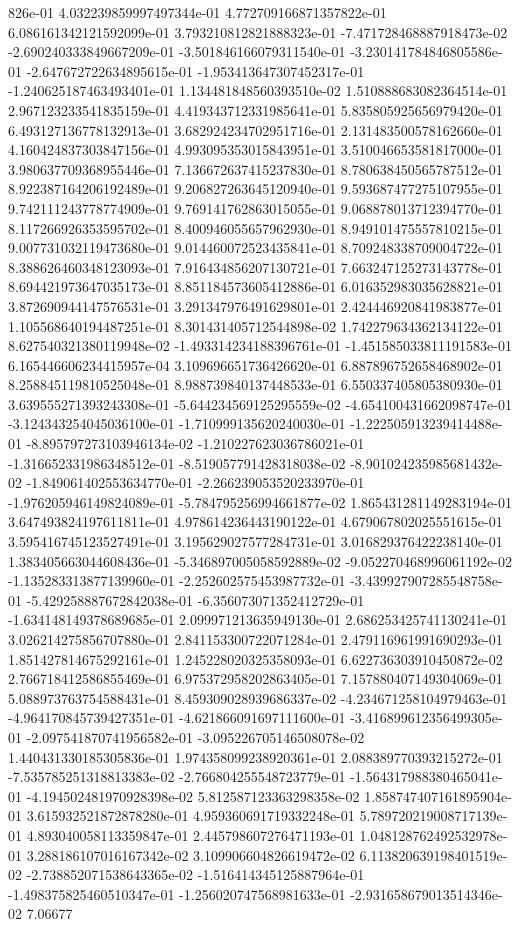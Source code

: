 826e-01	4.032239859997497344e-01	4.772709166871357822e-01	6.086161342121592099e-01	3.793210812821888323e-01	-7.471728468887918473e-02	-2.690240333849667209e-01	-3.501846166079311540e-01	-3.230141784846805586e-01	-2.647672722634895615e-01	-1.953413647307452317e-01	-1.240625187463493401e-01	1.134481848560393510e-02	1.510888683082364514e-01	2.967123233541835159e-01	4.419343712331985641e-01	5.835805925656979420e-01	6.493127136778132913e-01	3.682924234702951716e-01	2.131483500578162660e-01	4.160424837303847156e-01	4.993095353015843951e-01	3.510046653581817000e-01	3.980637709368955446e-01	7.136672637415237830e-01	8.780638450565787512e-01	8.922387164206192489e-01	9.206827263645120940e-01	9.593687477275107955e-01	9.742111243778774909e-01	9.769141762863015055e-01	9.068878013712394770e-01	8.117266926353595702e-01	8.400946055657962930e-01	8.949101475557810215e-01	9.007731032119473680e-01	9.014460072523435841e-01	8.709248338709004722e-01	8.388626460348123093e-01	7.916434856207130721e-01	7.663247125273143778e-01	8.694421973647035173e-01	8.851184573605412886e-01	6.016352983035628821e-01	3.872690944147576531e-01	3.291347976491629801e-01	2.424446920841983877e-01	1.105568640194487251e-01	8.301431405712544898e-02	1.742279634362134122e-01	8.627540321380119948e-02	-1.493314234188396761e-01	-1.451585033811191583e-01	6.165446606234415957e-04	3.109696651736426620e-01	6.887896752658468902e-01	8.258845119810525048e-01	8.988739840137448533e-01	6.550337405805380930e-01	3.639555271393243308e-01	-5.644234569125295559e-02	-4.654100431662098747e-01	-3.124343254045036100e-01	-1.710999135620240030e-01	-1.222505913239414488e-01	-8.895797273103946134e-02	-1.210227623036786021e-01	-1.316652331986348512e-01	-8.519057791428318038e-02	-8.901024235985681432e-02	-1.849061402553634770e-01	-2.266239053520233970e-01	-1.976205946149824089e-01	-5.784795256994661877e-02	1.865431281149283194e-01	3.647493824197611811e-01	4.978614236443190122e-01	4.679067802025551615e-01	3.595416745123527491e-01	3.195629027577284731e-01	3.016829376422238140e-01	1.383405663044608436e-01	-5.346897005058592889e-02	-9.052270468996061192e-02	-1.135283313877139960e-01	-2.252602575453987732e-01	-3.439927907285548758e-01	-5.429258887672842038e-01	-6.356073071352412729e-01	-1.634148149378689685e-01	2.099971213635949130e-01	2.686253425741130241e-01	3.026214275856707880e-01	2.841153300722071284e-01	2.479116961991690293e-01	1.851427814675292161e-01	1.245228020325358093e-01	6.622736303910450872e-02	2.766718412586855469e-01	6.975372958202863405e-01	7.157880407149304069e-01	5.088973763754588431e-01	8.459309028939686337e-02	-4.234671258104979463e-01	-4.964170845739427351e-01	-4.621866091697111600e-01	-3.416899612356499305e-01	-2.097541870741956582e-01	-3.095226705146508078e-02	1.440431330185305836e-01	1.974358099238920361e-01	2.088389770393215272e-01	-7.535785251318813383e-02	-2.766804255548723779e-01	-1.564317988380465041e-01	-4.194502481970928398e-02	5.812587123363298358e-02	1.858747407161895904e-01	3.615932521872878280e-01	4.959360691719332248e-01	5.789720219008717139e-01	4.893040058113359847e-01	2.445798607276471193e-01	1.048128762492532978e-01	3.288186107016167342e-02	3.109906604826619472e-02	6.113820639198401519e-02	-2.738852071538643365e-02	-1.516414345125887964e-01	-1.498375825460510347e-01	-1.256020747568981633e-01	-2.931658679013514346e-02	7.06677